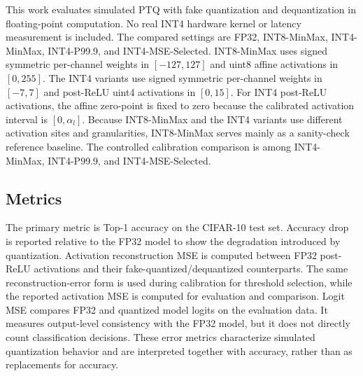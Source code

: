 This work evaluates simulated PTQ with fake quantization and dequantization in floating-point computation. No real INT4 hardware kernel or latency measurement is included. The compared settings are FP32, INT8-MinMax, INT4-MinMax, INT4-P99.9, and INT4-MSE-Selected. INT8-MinMax uses signed symmetric per-channel weights in $[-127,127]$ and uint8 affine activations in $[0,255]$. The INT4 variants use signed symmetric per-channel weights in $[-7,7]$ and post-ReLU uint4 activations in $[0,15]$. For INT4 post-ReLU activations, the affine zero-point is fixed to zero because the calibrated activation interval is $[0,\alpha_l]$. Because INT8-MinMax and the INT4 variants use different activation sites and granularities, INT8-MinMax serves mainly as a sanity-check reference baseline. The controlled calibration comparison is among INT4-MinMax, INT4-P99.9, and INT4-MSE-Selected.

\subsection{Metrics}
\label{subsec:metrics}

The primary metric is Top-1 accuracy on the CIFAR-10 test set. Accuracy drop is reported relative to the FP32 model to show the degradation introduced by quantization. Activation reconstruction MSE is computed between FP32 post-ReLU activations and their fake-quantized/dequantized counterparts. The same reconstruction-error form is used during calibration for threshold selection, while the reported activation MSE is computed for evaluation and comparison. Logit MSE compares FP32 and quantized model logits on the evaluation data. It measures output-level consistency with the FP32 model, but it does not directly count classification decisions. These error metrics characterize simulated quantization behavior and are interpreted together with accuracy, rather than as replacements for accuracy.
